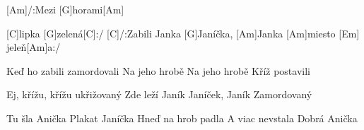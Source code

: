 
[Am]/:Mezi [G]horami[Am] 

[C]lipka [G]zelená[C]:/ 
[C]/:Zabili Janka 
[G]Janíčka, [Am]Janka 
[Am]miesto [Em] jeleň[Am]a:/ 

Keď ho zabili 
zamordovali 
Na jeho hrobě 
Na jeho hrobě 
Kříž postavili 

Ej, křížu, křížu 
ukřižovaný 
Zde leží Janík 
Janíček, Janík 
Zamordovaný 

Tu šla Anička 
Plakat Janíčka 
Hneď na hrob padla 
A viac nevstala 
Dobrá Anička 

